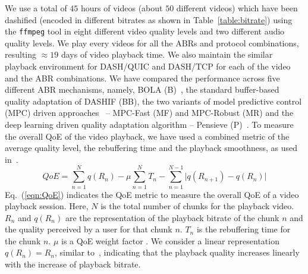 We use a total of $45$ hours of videos (about $50$ different videos) which have been dashified (encoded in different bitrates as shown in Table~\ref{table:bitrate}) using the {\tt ffmpeg} tool in eight different video quality levels and two different audio quality levels. We play every videos for all the ABRs and protocol combinations, resulting $\approx 19$ days of video playback time. We also maintain the similar playback environment for DASH/QUIC and DASH/TCP for each of the video and the ABR combinations.
We have compared the performance across five different ABR mechanisms, namely, BOLA (B)~\cite{bola-2016}, the standard buffer-based quality adaptation of DASHIF (BB), the two variants of model predictive control (MPC) driven approaches~\cite{yin2015control} -- MPC-Fast (MF) and MPC-Robust (MR) and the deep learning driven quality adaptation algorithm -- Pensieve (P)~\cite{mao2017neural}. To measure the overall QoE of the video playback, we have used a combined metric of the average quality level, the rebuffering time and the playback smoothness, as used in~\cite{yin2015control,mao2017neural}.
\begin{equation}
QoE=\sum_{n=1}^{N}q(R_n)-\mu\sum_{n=1}^{N}T_n-\sum_{n=1}^{N-1} \bigg\vert q(R_{n+1})-q(R_n)  \bigg\vert
\label{eqn:QoE}
\end{equation}
Eq.~(\ref{eqn:QoE}) indicates the QoE metric to measure the overall QoE of a video playback session. Here, $N$ is the total number of chunks for the playback video. $R_n$ and $q(R_n)$ are the representation of the playback bitrate of the chunk $n$ and the quality perceived by a user for that chunk $n$. $T_n$ is the rebuffering time for the chunk $n$. $\mu$ is a QoE weight factor \cite{yin2015control}. 
We consider a linear representation $q(R_n) = R_n$, similar to~\cite{yin2015control}, indicating that the playback quality increases linearly with the increase of playback bitrate. 
%

